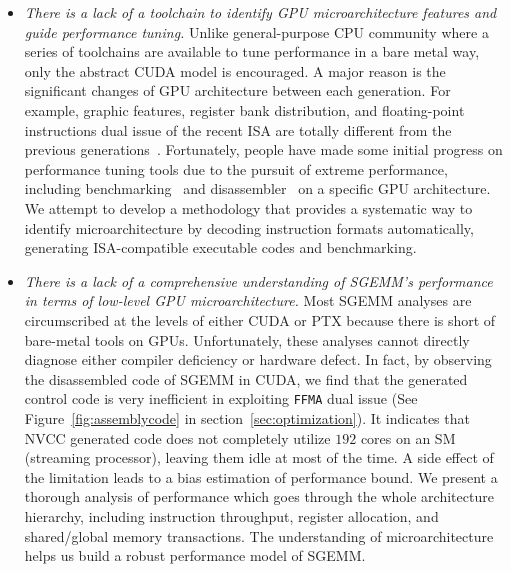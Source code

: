 \begin{itemize}
\item {\em There is a lack of a toolchain to identify GPU microarchitecture features and guide performance tuning.}
    Unlike general-purpose CPU community where a series of toolchains are available to tune performance in a bare metal
        way, only the abstract CUDA model is encouraged. A major reason is the significant changes of GPU architecture
        between each generation. For example, graphic features, register bank distribution, and floating-point 
instructions dual
        issue of the recent ISA are totally different from the previous generations~\cite{fermi}. Fortunately, people 
have made
        some initial progress on performance tuning tools due to the pursuit of extreme performance, including
        benchmarking~\cite{mei, volkov, wong} and disassembler~\cite{asfermi,bernstein2012usable,decuda,maxas} on a 
specific GPU architecture. We attempt to develop a methodology that provides a systematic way to identify 
microarchitecture by decoding instruction formats automatically, generating ISA-compatible executable codes and 
benchmarking.
\item {\em There is a lack of a comprehensive understanding of SGEMM's performance in terms of low-level GPU 
microarchitecture.} Most SGEMM analyses are circumscribed at the levels of either CUDA or PTX because there is short of 
bare-metal tools on GPUs. Unfortunately, these analyses cannot directly diagnose either compiler deficiency or hardware 
defect. In fact, by observing the disassembled code of SGEMM in CUDA, we find that the generated control code is very 
inefficient in exploiting {\tt FFMA} dual issue (See Figure~\ref{fig:assemblycode} in section~\ref{sec:optimization}). 
It indicates that NVCC generated code does not completely utilize $192$ cores on an SM (streaming processor), leaving 
them idle at most of the time. A side effect of the limitation leads to a bias estimation of performance bound. We 
present a thorough analysis of performance which goes through the whole architecture hierarchy, including instruction 
throughput, register allocation, and shared/global memory transactions. The understanding of microarchitecture helps us 
build a robust performance model of SGEMM.
\end{itemize}

